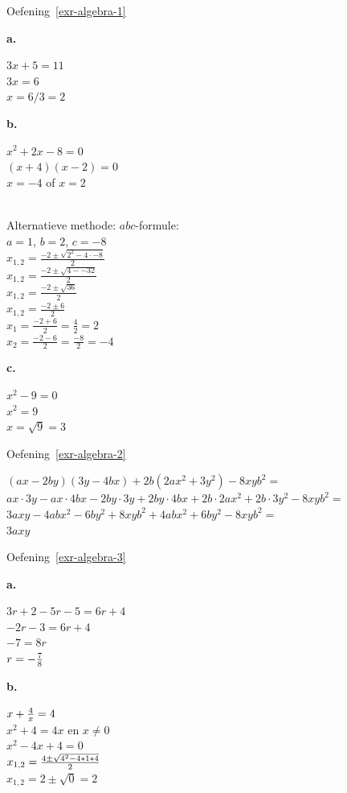 \documentclass[
  a4paper,
]{scrbook}
\theoremstyle{definition}
\theoremstyle{remark}
\begin{document}

Oefening~\ref{exr-algebra-1}

\textbf{a.}

\(3x + 5 = 11\)\\
\(3x = 6\)\\
\(x = 6/3 = 2\)

\textbf{b.}

\(x^2 + 2x - 8 = 0\)\\
\((x + 4)(x - 2) = 0\)\\
\(x = -4\) of \(x = 2\)\\
\strut \\
Alternatieve methode: \(abc\)-formule:\\
\(a=1\), \(b=2\), \(c=-8\)\\
\(x_{1,2} = \frac{-2 \pm \sqrt{2^2 - 4\cdot-8}}{2}\)\\
\(x_{1,2} = \frac{-2 \pm \sqrt{4 -- 32}}{2}\)\\
\(x_{1,2} = \frac{-2 \pm \sqrt{36}}{2}\)\\
\(x_{1,2} = \frac{-2 \pm 6}{2}\)\\
\(x_{1} = \frac{-2 + 6}{2} = \frac{4}{2} = 2\)\\
\(x_{2} = \frac{-2 - 6}{2} = \frac{-8}{2} = -4\)

\textbf{c.}

\(x^2 - 9 = 0\)\\
\(x^2 = 9\)\\
\(x = \sqrt{9} = 3\)

Oefening~\ref{exr-algebra-2}

\((ax-2by)(3y-4bx)+2b(2ax^2+3y^2)-8xyb^2 =\)\\
\(ax\cdot3y - ax\cdot4bx - 2by\cdot3y + 2by\cdot4bx + 2b\cdot2ax^2 + 2b\cdot3y^2 -8xyb^2 =\)\\
\(3axy - 4abx^2 - 6by^2 + 8xyb^2 + 4abx^2 + 6by^2 - 8xyb^2 =\)\\
\(3axy\)

Oefening~\ref{exr-algebra-3}

\textbf{a.}

\(3r + 2 -5r-5 = 6r+4\)\\
\(-2r-3=6r+4\)\\
\(-7=8r\)\\
\(r=-{7 \over 8}\)

\textbf{b.}

\(x + {4 \over x} =4\)\\
\(x^2+4=4x\) en \(x\neq0\)\\
\(x^2-4x+4=0\)\\
\(x_{1,2}={4 \pm \sqrt{4^2-4*1*4} \over 2}\)\\
\(x_{1,2}=2 \pm \sqrt{0}=2\)
\end{document}
